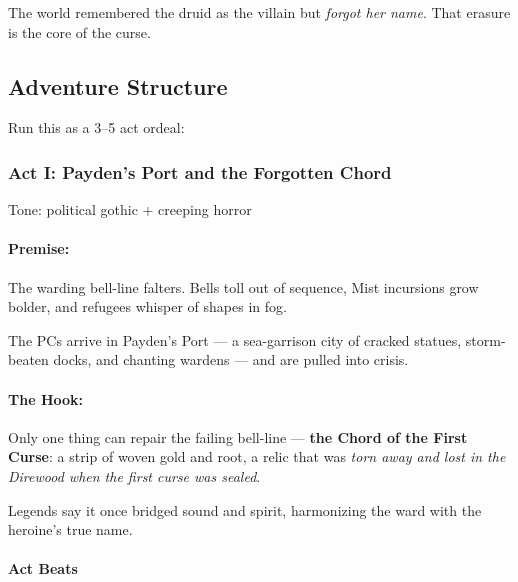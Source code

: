 \documentclass[11pt]{article}
\begin{document}
The world remembered the druid as the villain but \emph{forgot her name}.  
That erasure is the core of the curse.

\subsection{Adventure Structure}

Run this as a 3--5 act ordeal:

\subsubsection*{Act I: Payden's Port and the Forgotten Chord}

Tone: political gothic + creeping horror

\paragraph{Premise:}
The warding bell-line falters. Bells toll out of sequence,  
Mist incursions grow bolder, and refugees whisper of shapes in fog.

The PCs arrive in Payden's Port --- a sea-garrison city of cracked statues,  
storm-beaten docks, and chanting wardens --- and are pulled into crisis.

\paragraph{The Hook:}
Only one thing can repair the failing bell-line ---  
\textbf{the Chord of the First Curse}:  
a strip of woven gold and root, a relic that was  
\emph{torn away and lost in the Direwood when the first curse was sealed}.

Legends say it once bridged sound and spirit, harmonizing  
the ward with the heroine's true name.

\paragraph{Act Beats}
\end{document}
